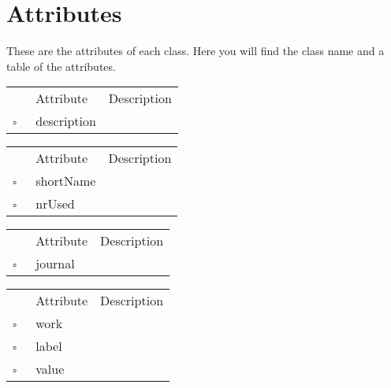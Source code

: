 \chapter{Attributes}
These are the attributes of each class. Here you will find the class name and a table of the attributes.     
\begin{table}
\caption{Acronym  }

\begin{longtable}{llp{8cm}}
& Attribute & Description \\
$\square$\ & description &  \\
\end{longtable}
\label{attr:Acronym}
\end{table}

\clearpage
\begin{table}
\caption{Affiliation  }

\begin{longtable}{llp{8cm}}
& Attribute & Description \\
$\square$\ & shortName &  \\
$\square$\ & nrUsed &  \\
\end{longtable}
\label{attr:Affiliation}
\end{table}

\begin{table}
\caption{Article  }

\begin{longtable}{llp{8cm}}
& Attribute & Description \\
$\square$\ & journal &  \\
\end{longtable}
\label{attr:Article}
\end{table}

\begin{table}
\caption{Assertion  }

\begin{longtable}{llp{8cm}}
& Attribute & Description \\
$\square$\ & work &  \\
$\square$\ & label &  \\
$\square$\ & value &  \\
\end{longtable}
\label{attr:Assertion}
\end{table}

